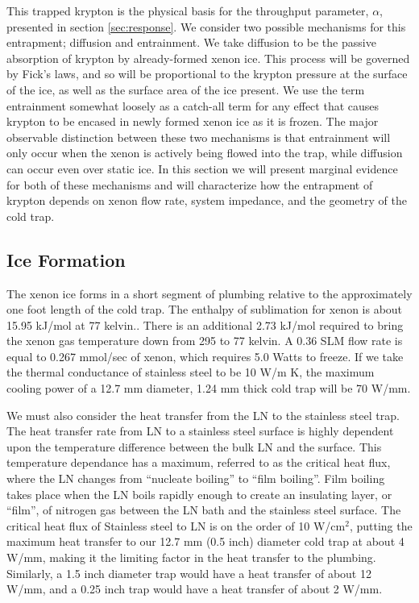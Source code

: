 \documentclass[12pt]{article}
\begin{document}
This trapped krypton is the physical basis for the throughput parameter, $\alpha$, presented in section \ref{sec:response}. We consider two possible mechanisms for this entrapment; diffusion and entrainment. We take diffusion to be the passive absorption of krypton by already-formed xenon ice. This process will be governed by Fick's laws, and so will be proportional to the krypton pressure at the surface of the ice, as well as the surface area of the ice present. We use the term entrainment somewhat loosely as a catch-all term for any effect that causes krypton to be encased in newly formed xenon ice as it is frozen. The major observable distinction between these two mechanisms is that entrainment will only occur when the xenon is actively being flowed into the trap, while diffusion can occur even over static ice. In this section we will present marginal evidence for both of these mechanisms and will characterize how the entrapment of krypton depends on xenon flow rate, system impedance, and the geometry of the cold trap.

\subsection{Ice Formation}
The xenon ice forms in a short segment of plumbing relative to the approximately one foot length of the cold trap. The enthalpy of sublimation for xenon is about 15.95 kJ/mol at 77 kelvin.\cite{vaporpressure}. There is an additional 2.73 kJ/mol required to bring the xenon gas temperature down from 295 to 77 kelvin. A 0.36 SLM flow rate is equal to 0.267 mmol/sec of xenon, which requires 5.0 Watts to freeze. If we take the thermal conductance of stainless steel to be 10 W/m K, the maximum cooling power of a 12.7 mm diameter, 1.24 mm thick cold trap will be 70 W/mm. 

We must also consider the heat transfer from the LN to the stainless steel trap. The heat transfer rate from LN to a stainless steel surface is highly dependent upon the temperature difference between the bulk LN and the surface. This temperature dependance has a maximum, referred to as the critical heat flux, where the LN changes from ``nucleate boiling'' to ``film boiling''. Film boiling takes place when the LN boils rapidly enough to create an insulating layer, or ``film'', of nitrogen gas between the LN bath and the stainless steel surface. The critical heat flux of Stainless steel to LN is on the order of 10 W/cm$^2$, putting the maximum heat transfer to our 12.7 mm (0.5 inch) diameter cold trap at about 4 W/mm, making it the limiting factor in the heat transfer to the plumbing.\cite{LNheatflux} Similarly, a 1.5 inch diameter trap would have a heat transfer of about 12 W/mm, and a 0.25 inch trap would have a heat transfer of about 2 W/mm.
\end{document}
